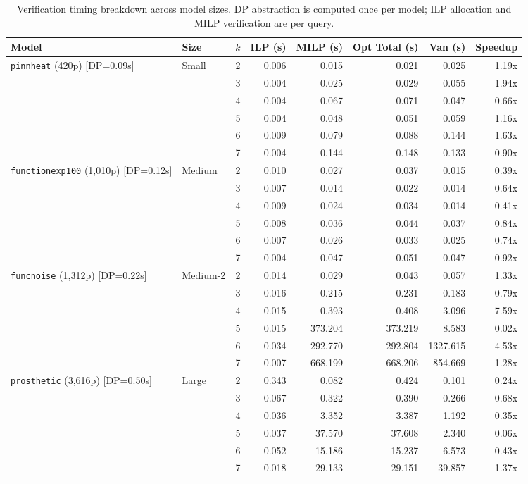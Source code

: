 \begin{table}[t]
\centering
\caption{Verification timing breakdown across model sizes. DP abstraction is computed once per model; ILP allocation and MILP verification are per query.}
\label{tab:timing}
\small
\begin{tabular}{llrrrrrr}
\toprule
Model & Size & $k$ & ILP (s) & MILP (s) & Opt Total (s) & Van (s) & Speedup \\
\midrule
  \multirow{6}{*}{\texttt{pinnheat} (420p) [DP=0.09s]} & \multirow{6}{*}{Small} & 2 & 0.006 & 0.015 & 0.021 & 0.025 & 1.19x \\
   &  & 3 & 0.004 & 0.025 & 0.029 & 0.055 & 1.94x \\
   &  & 4 & 0.004 & 0.067 & 0.071 & 0.047 & 0.66x \\
   &  & 5 & 0.004 & 0.048 & 0.051 & 0.059 & 1.16x \\
   &  & 6 & 0.009 & 0.079 & 0.088 & 0.144 & 1.63x \\
   &  & 7 & 0.004 & 0.144 & 0.148 & 0.133 & 0.90x \\
\midrule
  \multirow{6}{*}{\texttt{functionexp100} (1,010p) [DP=0.12s]} & \multirow{6}{*}{Medium} & 2 & 0.010 & 0.027 & 0.037 & 0.015 & 0.39x \\
   &  & 3 & 0.007 & 0.014 & 0.022 & 0.014 & 0.64x \\
   &  & 4 & 0.009 & 0.024 & 0.034 & 0.014 & 0.41x \\
   &  & 5 & 0.008 & 0.036 & 0.044 & 0.037 & 0.84x \\
   &  & 6 & 0.007 & 0.026 & 0.033 & 0.025 & 0.74x \\
   &  & 7 & 0.004 & 0.047 & 0.051 & 0.047 & 0.92x \\
\midrule
  \multirow{6}{*}{\texttt{funcnoise} (1,312p) [DP=0.22s]} & \multirow{6}{*}{Medium-2} & 2 & 0.014 & 0.029 & 0.043 & 0.057 & 1.33x \\
   &  & 3 & 0.016 & 0.215 & 0.231 & 0.183 & 0.79x \\
   &  & 4 & 0.015 & 0.393 & 0.408 & 3.096 & 7.59x \\
   &  & 5 & 0.015 & 373.204 & 373.219 & 8.583 & 0.02x \\
   &  & 6 & 0.034 & 292.770 & 292.804 & 1327.615 & 4.53x \\
   &  & 7 & 0.007 & 668.199 & 668.206 & 854.669 & 1.28x \\
\midrule
  \multirow{6}{*}{\texttt{prosthetic} (3,616p) [DP=0.50s]} & \multirow{6}{*}{Large} & 2 & 0.343 & 0.082 & 0.424 & 0.101 & 0.24x \\
   &  & 3 & 0.067 & 0.322 & 0.390 & 0.266 & 0.68x \\
   &  & 4 & 0.036 & 3.352 & 3.387 & 1.192 & 0.35x \\
   &  & 5 & 0.037 & 37.570 & 37.608 & 2.340 & 0.06x \\
   &  & 6 & 0.052 & 15.186 & 15.237 & 6.573 & 0.43x \\
   &  & 7 & 0.018 & 29.133 & 29.151 & 39.857 & 1.37x \\
\bottomrule
\end{tabular}
\end{table}